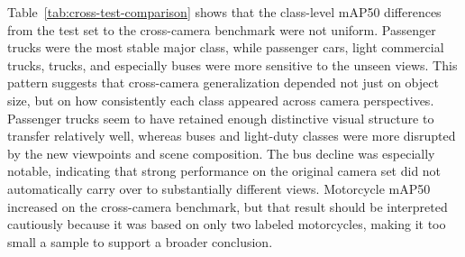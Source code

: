 \begin{table}[!htbp]
    \centering
    \caption{Comparison of held-out test set and cross-camera benchmark performance for the final YOLOv11s model. The change column reports the difference between the cross-camera benchmark and the held-out test set ($\Delta = \text{cross-camera} - \text{held-out test}$).}
    \label{tab:cross-test-comparison}
\end{table}

Table~\ref{tab:cross-test-comparison} shows that the class-level mAP50 differences from the test
set to the cross-camera benchmark were not uniform.
Passenger trucks were the most stable major class, while passenger cars, light 
commercial trucks, trucks, and especially buses were more sensitive to the unseen 
views. This pattern suggests that cross-camera generalization depended not just 
on object size, but on how consistently each class appeared across camera perspectives.
Passenger trucks seem to have retained enough distinctive visual structure to 
transfer relatively well, whereas buses and light-duty classes were more disrupted 
by the new viewpoints and scene composition. The bus decline was especially notable,
indicating that strong performance on the original camera set did not automatically 
carry over to substantially different views. Motorcycle mAP50 increased on the 
cross-camera benchmark, but that result should be interpreted cautiously because 
it was based on only two labeled motorcycles, making it too small a sample to 
support a broader conclusion.

